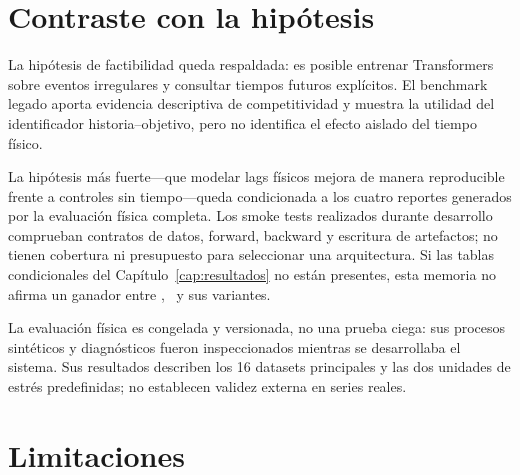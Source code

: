\section{Contraste con la hipótesis}
\label{sec:contraste-hipotesis}

La hipótesis de factibilidad queda respaldada: es posible entrenar Transformers sobre eventos irregulares y consultar tiempos futuros explícitos. El benchmark legado aporta evidencia descriptiva de competitividad y muestra la utilidad del identificador historia--objetivo, pero no identifica el efecto aislado del tiempo físico.

La hipótesis más fuerte---que modelar lags físicos mejora de manera reproducible frente a controles sin tiempo---queda condicionada a los cuatro reportes generados por la evaluación física completa. Los smoke tests realizados durante desarrollo comprueban contratos de datos, forward, backward y escritura de artefactos; no tienen cobertura ni presupuesto para seleccionar una arquitectura. Si las tablas condicionales del Capítulo~\ref{cap:resultados} no están presentes, esta memoria no afirma un ganador entre \QueryCross, \ContinuousBasis\ y sus variantes.

La evaluación física es congelada y versionada, no una prueba ciega: sus procesos sintéticos y diagnósticos fueron inspeccionados mientras se desarrollaba el sistema. Sus resultados describen los 16 datasets principales y las dos unidades de estrés predefinidas; no establecen validez externa en series reales.

\section{Limitaciones}
\label{sec:limitaciones-finales}


